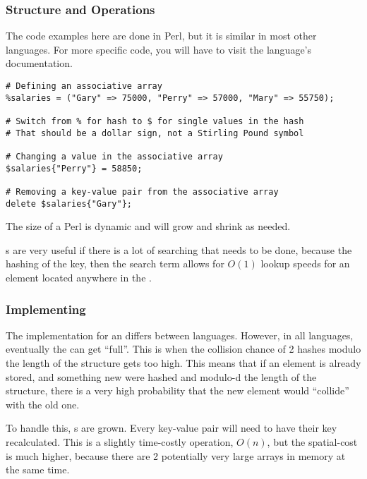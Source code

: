 \subsubsection{Structure and Operations}\label{subsubsec:Structure_and_Ops_Associative_Arrays}
The code examples here are done in Perl, but it is similar in most other languages.
For more specific code, you will have to visit the language's documentation.
\begin{verbatim}
# Defining an associative array
%salaries = ("Gary" => 75000, "Perry" => 57000, "Mary" => 55750);

# Switch from % for hash to $ for single values in the hash
# That should be a dollar sign, not a Stirling Pound symbol

# Changing a value in the associative array
$salaries{"Perry"} = 58850;

# Removing a key-value pair from the associative array
delete $salaries{"Gary"};
\end{verbatim}

The size of a Perl  is dynamic and will grow and shrink as needed.

s are very useful if there is a lot of searching that needs to be done, because the hashing of the key, then the search term allows for $O(1)$ lookup speeds for an element located anywhere in the .

\subsubsection{Implementing }\label{subsubsec:Implementing_Associative_Arrays}
The implementation for an  differs between languages.
However, in all languages, eventually the  can get ``full''.
This is when the collision chance of 2 hashes modulo the length of the structure gets too high.
This means that if an element is already stored, and something new were hashed and modulo-d the length of the structure, there is a very high probability that the new element would ``collide'' with the old one.

To handle this, s are grown.
Every key-value pair will need to have their key recalculated.
This is a slightly time-costly operation, $O(n)$, but the spatial-cost is much higher, because there are 2 potentially very large arrays in memory at the same time.

